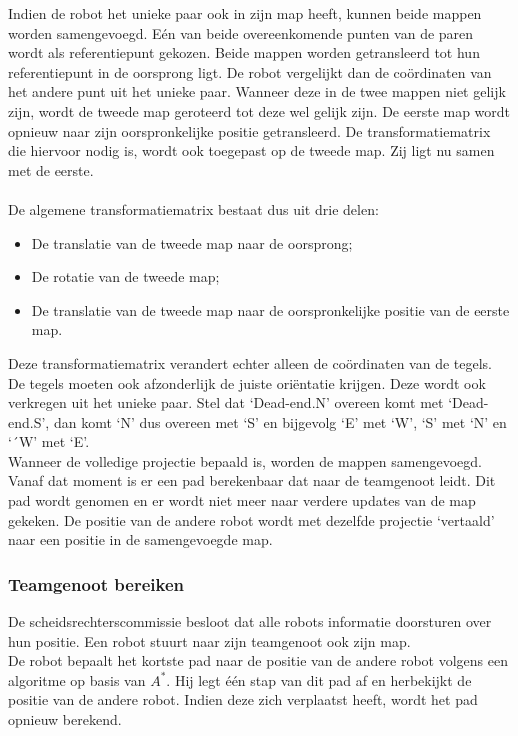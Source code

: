 \documentclass[eind]{penoverslag}
\begin{document}
Indien de robot het unieke paar ook in zijn map heeft, kunnen beide mappen worden samengevoegd. E\'en van beide overeenkomende punten van de paren wordt als referentiepunt gekozen. Beide mappen worden getransleerd tot hun referentiepunt in de oorsprong ligt. De robot vergelijkt dan de co\"ordinaten van het andere punt uit het unieke paar. Wanneer deze in de twee mappen niet gelijk zijn, wordt de tweede map geroteerd tot deze wel gelijk zijn. De eerste map wordt opnieuw naar zijn oorspronkelijke positie getransleerd. De transformatiematrix die hiervoor nodig is, wordt ook toegepast op de tweede map. Zij ligt nu samen met de eerste.\\ \\
De algemene transformatiematrix bestaat dus uit drie delen:
\begin{itemize}
	\item De translatie van de tweede map naar de oorsprong;
	\item De rotatie van de tweede map;
	\item De translatie van de tweede map naar de oorspronkelijke positie van de eerste map.
\end{itemize}

Deze transformatiematrix verandert echter alleen de co\"ordinaten van de tegels. De tegels moeten ook afzonderlijk de juiste ori\"entatie krijgen. Deze wordt ook verkregen uit het unieke paar. Stel dat `Dead-end.N' overeen komt met `Dead-end.S', dan komt `N' dus overeen met `S' en bijgevolg `E' met `W', `S' met `N' en `´W' met `E'.\\

Wanneer de volledige projectie bepaald is, worden de mappen samengevoegd. Vanaf dat moment is er een pad berekenbaar dat naar de teamgenoot leidt. Dit pad wordt genomen en er wordt niet meer naar verdere updates van de map gekeken. De positie van de andere robot wordt met dezelfde projectie `vertaald' naar een positie in de samengevoegde map.

\subsubsection{Teamgenoot bereiken}
\label{sssec:AlgoTeam}

De scheidsrechterscommissie besloot dat alle robots informatie doorsturen over hun positie. Een robot stuurt naar zijn teamgenoot ook zijn map.\\

De robot bepaalt het kortste pad naar de positie van de andere robot volgens een algoritme op basis van $A^{*}$. Hij legt \'e\'en stap van dit pad af en herbekijkt de positie van de andere robot. Indien deze zich verplaatst heeft, wordt het pad opnieuw berekend.
\end{document}
